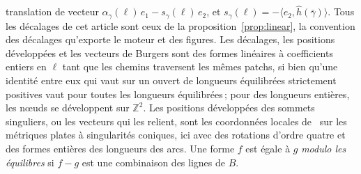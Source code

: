 \documentclass[11pt,a4paper]{article}
\newcommand{\Z}{\mathbb{Z}}
\newcommand{\shift}{s}
\begin{document}
translation de vecteur $\alpha_\gamma(\ell)\, e_1 - \shift_\gamma(\ell)\, e_2$,
et $\shift_\gamma(\ell) = -\langle e_2, \hat h(\bar\gamma) \rangle$. Tous les
décalages de cet article sont ceux de la proposition~\ref{prop:linear}, la
convention des décalages qu'exporte le moteur et des figures. Les décalages, les positions développées et les vecteurs de Burgers
sont des formes linéaires à coefficients entiers en $\ell$ tant que les
chemins traversent les mêmes patchs, si bien qu'une identité entre eux qui
vaut sur un ouvert de longueurs équilibrées strictement positives vaut pour
toutes les longueurs équilibrées\,; pour des longueurs entières, les nœuds se
développent sur $\Z^2$. Les positions développées des sommets singuliers, ou
les vecteurs qui les relient, sont les coordonnées locales
de~\cite{thurston1998shapes} sur les métriques plates à singularités
coniques, ici avec des rotations d'ordre quatre et des formes entières des
longueurs des arcs. Une forme $f$ est égale à $g$ \emph{modulo les
équilibres} si $f - g$ est une combinaison des lignes de $B$.
\end{document}
